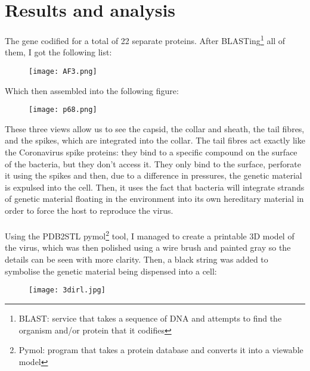 \section{Results and analysis}
The gene codified for a total of 22 separate proteins. After BLASTing\footnote{BLAST: service that takes a sequence of DNA and attempts to find the organism and/or protein that it codifies} all of them, I got the following list:
\begin{center}\begin{figure}[H]\centering\texttt{[image: AF3.png]}\end{figure}\end{center}
Which then assembled into the following figure:
\begin{center}\begin{figure}[H]\centering\texttt{[image: p68.png]}\end{figure}\end{center}
These three views allow us to see the capsid, the collar and sheath, the tail fibres, and the spikes, which are integrated into the collar. The tail fibres act exactly like the Coronavirus spike proteins: they bind to a specific compound on the surface of the bacteria, but they don't access it. They only bind to the surface, perforate it using the spikes and then, due to a difference in pressures, the genetic material is expulsed into the cell. Then, it uses the fact that bacteria will integrate strands of genetic material floating in the environment into its own hereditary material in order to force the host to reproduce the virus.
\paragraph{}Using the PDB2STL pymol\footnote{Pymol: program that takes a protein database and converts it into a viewable model} tool, I managed to create a printable 3D model of the virus, which was then polished using a wire brush and painted gray so the details can be seen with more clarity. Then, a black string was added to symbolise the genetic material being dispensed into a cell:
\begin{center}\begin{figure}[H]\centering\texttt{[image: 3dirl.jpg]}\end{figure}\end{center}